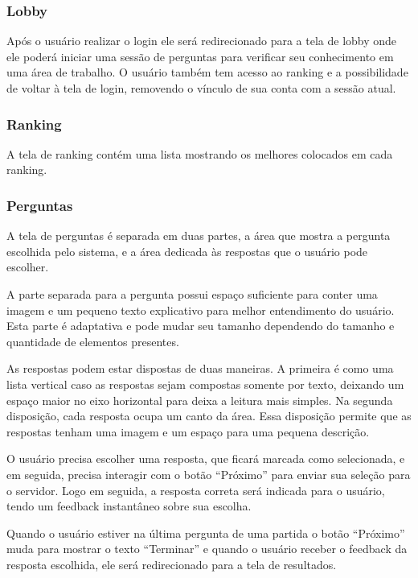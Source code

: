 \subsubsection{Lobby}
\label{subsubsec:lobby}

Após o usuário realizar o login ele será redirecionado para a tela de lobby onde ele poderá iniciar uma sessão de perguntas para verificar seu conhecimento em uma área de trabalho. O usuário também tem acesso ao ranking e a possibilidade de voltar à tela de login, removendo o vínculo de sua conta com a sessão atual.


\subsubsection{Ranking}
\label{subsubsec:rankingunity}

A tela de ranking contém uma lista mostrando os melhores colocados em cada ranking.


\subsubsection{Perguntas}
\label{subsubsec:perguntasunity}

A tela de perguntas é separada em duas partes, a área que mostra a pergunta escolhida pelo sistema, e a área dedicada às respostas que o usuário pode escolher.

A parte separada para a pergunta possui espaço suficiente para conter uma imagem e um pequeno texto explicativo para melhor entendimento do usuário. Esta parte é adaptativa e pode mudar seu tamanho dependendo do tamanho e quantidade de elementos presentes.

As respostas podem estar dispostas de duas maneiras. A primeira é como uma lista vertical caso as respostas sejam compostas somente por texto, deixando um espaço maior no eixo horizontal para deixa a leitura mais simples. Na segunda disposição, cada resposta ocupa um canto da área. Essa disposição permite que as respostas tenham uma imagem e um espaço para uma pequena descrição.

O usuário precisa escolher uma resposta, que ficará marcada como selecionada, e em seguida, precisa interagir com o botão “Próximo” para enviar sua seleção para o servidor. Logo em seguida, a resposta correta será indicada para o usuário, tendo um feedback instantâneo sobre sua escolha.

Quando o usuário estiver na última pergunta de uma partida o botão “Próximo” muda para mostrar o texto “Terminar” e quando o usuário receber o feedback da resposta escolhida, ele será redirecionado para a tela de resultados.


